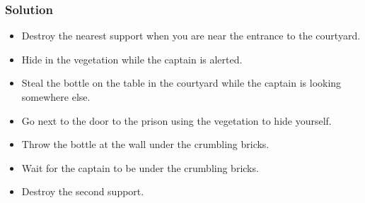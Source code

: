 \subsubsection*{Solution}
\begin{itemize}
	\item Destroy the nearest support when you are near the entrance to the courtyard.
	\item Hide in the vegetation while the captain is alerted.
	\item Steal the bottle on the table in the courtyard while the captain is looking somewhere else.
	\item Go next to the door to the prison using the vegetation to hide yourself.
	\item Throw the bottle at the wall under the crumbling bricks.
	\item Wait for the captain to be under the crumbling bricks.
	\item Destroy the second support.
\end{itemize}
